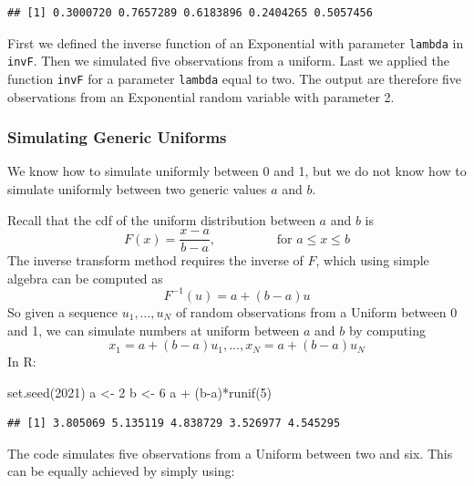 \documentclass[
]{book}
\newenvironment{Shaded}{\begin{snugshade}}{\end{snugshade}}
\newcommand{\DecValTok}[1]{\textcolor[rgb]{0.00,0.00,0.81}{#1}}
\newcommand{\FunctionTok}[1]{\textcolor[rgb]{0.00,0.00,0.00}{#1}}
\newcommand{\NormalTok}[1]{#1}
\newcommand{\OtherTok}[1]{\textcolor[rgb]{0.56,0.35,0.01}{#1}}
\newcommand{\SpecialCharTok}[1]{\textcolor[rgb]{0.00,0.00,0.00}{#1}}
\begin{document}
\begin{verbatim}
## [1] 0.3000720 0.7657289 0.6183896 0.2404265 0.5057456
\end{verbatim}

First we defined the inverse function of an Exponential with parameter \texttt{lambda} in \texttt{invF}. Then we simulated five observations from a uniform. Last we applied the function \texttt{invF} for a parameter \texttt{lambda} equal to two. The output are therefore five observations from an Exponential random variable with parameter 2.

\hypertarget{simulating-generic-uniforms}{%
\subsubsection{Simulating Generic Uniforms}\label{simulating-generic-uniforms}}

We know how to simulate uniformly between 0 and 1, but we do not know how to simulate uniformly between two generic values \(a\) and \(b\).

Recall that the cdf of the uniform distribution between \(a\) and \(b\) is
\[
F(x)=\frac{x-a}{b-a}, \hspace{2cm} \mbox{for } a\leq x \leq b
\]
The inverse transform method requires the inverse of \(F\), which using simple algebra can be computed as
\[
F^{-1}(u)=a + (b-a)u
\]
So given a sequence \(u_1,\dots,u_N\) of random observations from a Uniform between 0 and 1, we can simulate numbers at uniform between \(a\) and \(b\) by computing
\[
x_1 = a + (b-a)u_1,\dots, x_N=a+(b-a)u_N
\]
In R:

\begin{Shaded}
\begin{Highlighting}[]
\FunctionTok{set.seed}\NormalTok{(}\DecValTok{2021}\NormalTok{)}
\NormalTok{a }\OtherTok{\textless{}{-}} \DecValTok{2}
\NormalTok{b }\OtherTok{\textless{}{-}} \DecValTok{6}
\NormalTok{a }\SpecialCharTok{+}\NormalTok{ (b}\SpecialCharTok{{-}}\NormalTok{a)}\SpecialCharTok{*}\FunctionTok{runif}\NormalTok{(}\DecValTok{5}\NormalTok{)}
\end{Highlighting}
\end{Shaded}

\begin{verbatim}
## [1] 3.805069 5.135119 4.838729 3.526977 4.545295
\end{verbatim}

The code simulates five observations from a Uniform between two and six. This can be equally achieved by simply using:
\end{document}
